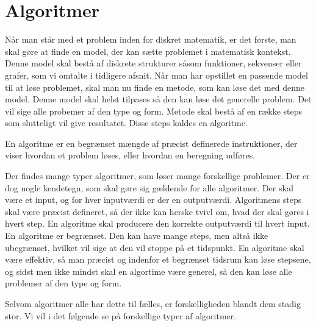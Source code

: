 \chapter{Algoritmer} \label{kap.algo}
Når man står med et problem inden for diskret matematik, er det første, man skal gøre at finde en model, der kan sætte problemet i matematisk kontekst. Denne model skal bestå af diskrete strukturer såsom funktioner, sekvenser eller grafer, som vi omtalte i tidligere afsnit. Når man har opstillet en passende model til at løse problemet, skal man nu finde en metode, som kan løse det med denne model. Denne model skal helst tilpases så den kan løse det generelle problem. Det vil sige alle probemer af den type og form. Metode skal bestå af en række steps som slutteligt vil give resultatet. Disse steps kaldes en algoritme. 
\begin{defn}
[Algoritmer] En algoritme er en begrænset mængde af præcist definerede instruktioner, der viser hvordan et problem løses, eller hvordan en beregning udføres. 

\end{defn}
Der findes mange typer algoritmer, som løser mange forskellige problemer. Der er dog nogle kendetegn, som skal gøre sig gældende for alle algoritmer. Der skal være et input, og for hver inputværdi er der en outputværdi. Algoritmens steps skal være præcist defineret, så der ikke kan herske tvivl om, hvad der skal gøres i hvert step. En algoritme skal producere den korrekte outputværdi til hvert input. En algoritme er begrænset. Den kan have mange steps, men altså ikke ubegrænset, hvilket vil sige at den vil stoppe på et tidspunkt. En algoritme skal være effektiv, så man præcist og indenfor et begrænset tidsrum kan løse stepsene, og sidst men ikke mindst skal en algortime være generel, så den kan løse alle problemer af den type og form.

Selvom algoritmer alle har dette til fælles, er forskelligheden blandt dem stadig stor. Vi vil i det følgende se på forskellige typer af algoritmer.




